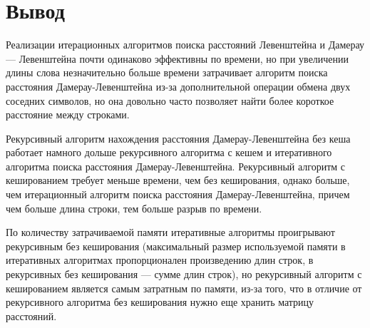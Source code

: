 \section*{Вывод}

Реализации итерационных алгоритмов поиска расстояний Левенштейна и Дамерау — Левенштейна почти одинаково эффективны по времени, но при увеличении длины слова незначительно больше времени затрачивает алгоритм поиска расстояния Дамерау-Левенштейна из-за дополнительной операции обмена двух соседних символов, но она довольно часто позволяет найти более короткое расстояние между строками.

Рекурсивный алгоритм нахождения расстояния Дамерау-Левенштейна без кеша работает намного дольше рекурсивного алгоритма с кешем и итеративного алгоритма поиска расстояния Дамерау-Левенштейна. Рекурсивный алгоритм с кешированием требует меньше времени, чем без кеширования, однако больше, чем итерационный алгоритм поиска расстояния Дамерау-Левенштейна, причем чем больше длина строки, тем больше разрыв по времени. 

По количеству затрачиваемой памяти итеративные алгоритмы проигрывают рекурсивным без кеширования (максимальный размер используемой памяти в итеративных алгоритмах пропорционален произведению длин строк, в рекурсивных без кеширования — сумме длин строк), но рекурсивный алгоритм с кешированием является самым затратным по памяти, из-за того, что в отличие от рекурсивного алгоритма без кеширования нужно еще хранить матрицу расстояний.

